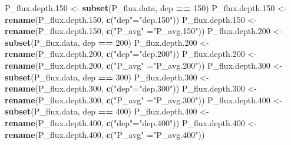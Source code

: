 \documentclass[]{article}
\newenvironment{Shaded}{\begin{snugshade}}{\end{snugshade}}
\newcommand{\DecValTok}[1]{\textcolor[rgb]{0.00,0.00,0.81}{#1}}
\newcommand{\FloatTok}[1]{\textcolor[rgb]{0.00,0.00,0.81}{#1}}
\newcommand{\KeywordTok}[1]{\textcolor[rgb]{0.13,0.29,0.53}{\textbf{#1}}}
\newcommand{\NormalTok}[1]{#1}
\newcommand{\OperatorTok}[1]{\textcolor[rgb]{0.81,0.36,0.00}{\textbf{#1}}}
\newcommand{\StringTok}[1]{\textcolor[rgb]{0.31,0.60,0.02}{#1}}
\begin{document}
\begin{Shaded}
\begin{Highlighting}[]
\NormalTok{P_flux.depth}\FloatTok{.150}\NormalTok{ <-}\StringTok{ }\KeywordTok{subset}\NormalTok{(P_flux.data, dep }\OperatorTok{==}\StringTok{ }\DecValTok{150}\NormalTok{)}
\NormalTok{P_flux.depth}\FloatTok{.150}\NormalTok{ <-}\StringTok{ }\KeywordTok{rename}\NormalTok{(P_flux.depth}\FloatTok{.150}\NormalTok{, }\KeywordTok{c}\NormalTok{(}\StringTok{"dep"}\NormalTok{=}\StringTok{"dep.150"}\NormalTok{))}
\NormalTok{P_flux.depth}\FloatTok{.150}\NormalTok{ <-}\StringTok{ }\KeywordTok{rename}\NormalTok{(P_flux.depth}\FloatTok{.150}\NormalTok{, }\KeywordTok{c}\NormalTok{(}\StringTok{"P_avg"}\NormalTok{ =}\StringTok{"P_avg.150"}\NormalTok{))}
\NormalTok{P_flux.depth}\FloatTok{.200}\NormalTok{ <-}\StringTok{ }\KeywordTok{subset}\NormalTok{(P_flux.data, dep }\OperatorTok{==}\StringTok{ }\DecValTok{200}\NormalTok{)}
\NormalTok{P_flux.depth}\FloatTok{.200}\NormalTok{ <-}\StringTok{ }\KeywordTok{rename}\NormalTok{(P_flux.depth}\FloatTok{.200}\NormalTok{, }\KeywordTok{c}\NormalTok{(}\StringTok{"dep"}\NormalTok{=}\StringTok{"dep.200"}\NormalTok{))}
\NormalTok{P_flux.depth}\FloatTok{.200}\NormalTok{ <-}\StringTok{ }\KeywordTok{rename}\NormalTok{(P_flux.depth}\FloatTok{.200}\NormalTok{, }\KeywordTok{c}\NormalTok{(}\StringTok{"P_avg"}\NormalTok{ =}\StringTok{"P_avg.200"}\NormalTok{))}
\NormalTok{P_flux.depth}\FloatTok{.300}\NormalTok{ <-}\StringTok{ }\KeywordTok{subset}\NormalTok{(P_flux.data, dep }\OperatorTok{==}\StringTok{ }\DecValTok{300}\NormalTok{)}
\NormalTok{P_flux.depth}\FloatTok{.300}\NormalTok{ <-}\StringTok{ }\KeywordTok{rename}\NormalTok{(P_flux.depth}\FloatTok{.300}\NormalTok{, }\KeywordTok{c}\NormalTok{(}\StringTok{"dep"}\NormalTok{=}\StringTok{"dep.300"}\NormalTok{))}
\NormalTok{P_flux.depth}\FloatTok{.300}\NormalTok{ <-}\StringTok{ }\KeywordTok{rename}\NormalTok{(P_flux.depth}\FloatTok{.300}\NormalTok{, }\KeywordTok{c}\NormalTok{(}\StringTok{"P_avg"}\NormalTok{ =}\StringTok{"P_avg.300"}\NormalTok{))}
\NormalTok{P_flux.depth}\FloatTok{.400}\NormalTok{ <-}\StringTok{ }\KeywordTok{subset}\NormalTok{(P_flux.data, dep }\OperatorTok{==}\StringTok{ }\DecValTok{400}\NormalTok{)}
\NormalTok{P_flux.depth}\FloatTok{.400}\NormalTok{ <-}\StringTok{ }\KeywordTok{rename}\NormalTok{(P_flux.depth}\FloatTok{.400}\NormalTok{, }\KeywordTok{c}\NormalTok{(}\StringTok{"dep"}\NormalTok{=}\StringTok{"dep.400"}\NormalTok{))}
\NormalTok{P_flux.depth}\FloatTok{.400}\NormalTok{ <-}\StringTok{ }\KeywordTok{rename}\NormalTok{(P_flux.depth}\FloatTok{.400}\NormalTok{, }\KeywordTok{c}\NormalTok{(}\StringTok{"P_avg"}\NormalTok{ =}\StringTok{"P_avg.400"}\NormalTok{))}
\end{Highlighting}
\end{Shaded}
\end{document}

